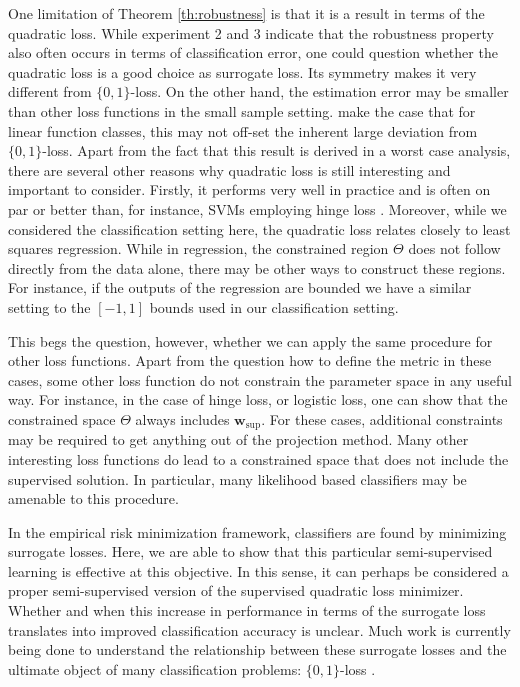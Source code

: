 \documentclass{article}
\renewcommand{\vec}[1]{\mathbf{#1}}
\begin{document}
One limitation of Theorem \ref{th:robustness} is that it is a result in terms of the quadratic loss. While experiment 2 and 3 indicate that the robustness property also often occurs in terms of classification error, one could question whether the quadratic loss is a good choice as surrogate loss. Its symmetry makes it very different from $\{0,1\}$-loss. On the other hand, the estimation error may be smaller than other loss functions in the small sample setting. \cite{Ben-David2012} make the case that for linear function classes, this may not off-set the inherent large deviation from $\{0,1\}$-loss. Apart from the fact that this result is derived in a worst case analysis, there are several other reasons why quadratic loss is still interesting and important to consider. Firstly, it performs very well in practice and is often on par or better than, for instance, SVMs employing hinge loss \cite{Rasmussen2005,Hastie2001,Poggio2003}. Moreover, while we considered the classification setting here, the quadratic loss relates closely to least squares regression. While in regression, the constrained region $\Theta$ does not follow directly from the data alone, there may be other ways to construct these regions. For instance, if the outputs of the regression are bounded we have a similar setting to the $[-1,1]$ bounds used in our classification setting.

This begs the question, however, whether we can apply the same procedure for other loss functions. Apart from the question how to define the metric in these cases, some other loss function do not constrain the parameter space in any useful way. For instance, in the case of hinge loss, or logistic loss, one can show that the constrained space $\Theta$ always includes $\vec{w}_\text{sup}$. For these cases, additional constraints may be required to get anything out of the projection method. Many other interesting loss functions do lead to a constrained space that does not include the supervised solution. In particular, many likelihood based classifiers may be amenable to this procedure.

In the empirical risk minimization framework, classifiers are found by minimizing surrogate losses. Here, we are able to show that this particular semi-supervised learning is effective at this objective. In this sense, it can  perhaps be considered a proper semi-supervised version of the supervised quadratic loss minimizer. Whether and when this increase in performance in terms of the surrogate loss translates into improved classification accuracy is unclear. Much work is currently being done to understand the relationship between these surrogate losses and the ultimate object of many classification problems: $\{0,1\}$-loss \cite{Bartlett2006,Ben-David2012}. 
\end{document}

